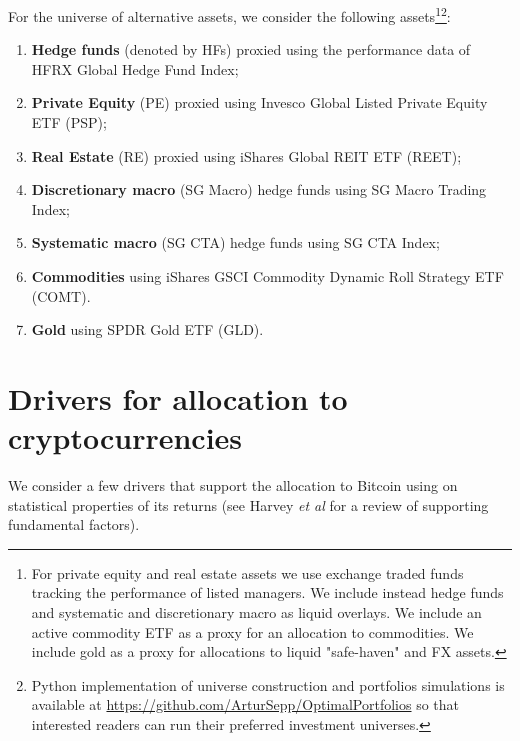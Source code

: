 \documentclass[pdftex,11pt,a4paper] {article}
\begin{document}
For the universe of alternative assets, we consider the following assets\footnote{For private equity and real estate assets we use exchange traded funds tracking the performance of listed managers. We include instead hedge funds and systematic and discretionary macro as liquid overlays. We include an active commodity ETF as a proxy for an allocation to commodities. We include gold as a proxy for allocations to liquid "safe-haven" and FX assets.}\footnote{Python implementation of universe construction and portfolios simulations is available at \href{https://github.com/ArturSepp/OptimalPortfolios}{https://github.com/ArturSepp/OptimalPortfolios} so that interested readers can run their preferred investment universes.}:
\begin{enumerate}

\item \textbf{Hedge funds} (denoted by HFs) proxied using the performance data of HFRX Global Hedge Fund Index;

\item \textbf{Private Equity} (PE) proxied using Invesco Global Listed Private Equity ETF (PSP);

\item \textbf{Real Estate} (RE) proxied using iShares Global REIT ETF (REET);


\item \textbf{Discretionary macro} (SG Macro) hedge funds using SG Macro Trading Index;
	
\item \textbf{Systematic macro} (SG CTA) hedge funds using SG CTA Index;


\item \textbf{Commodities} using iShares GSCI Commodity Dynamic Roll Strategy ETF (COMT).

\item \textbf{Gold} using SPDR Gold ETF (GLD).
	
	
\end{enumerate}







\section{Drivers for allocation to cryptocurrencies}

We consider a few drivers that support the allocation to Bitcoin using on statistical properties of its returns (see Harvey \textit{et al} \cite{Harvey2022} for a review of supporting fundamental factors).
\end{document}
